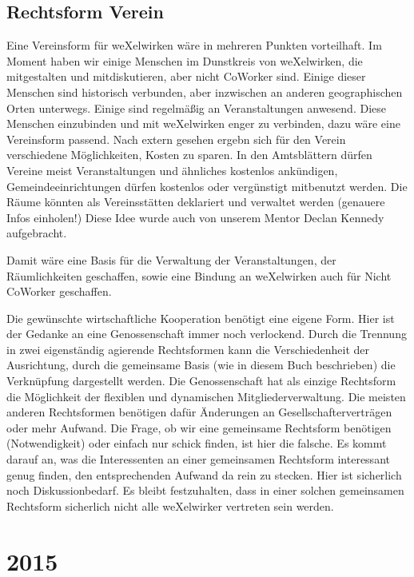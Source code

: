\subsection{Rechtsform Verein}
Eine Vereinsform für weXelwirken wäre in mehreren Punkten vorteilhaft.
%
Im Moment haben wir einige Menschen im Dunstkreis von weXelwirken, die mitgestalten und mitdiskutieren, aber nicht CoWorker sind.
%
Einige dieser Menschen sind historisch verbunden, aber inzwischen an anderen geographischen Orten unterwegs.
%
Einige sind regelmäßig an Veranstaltungen anwesend.
%
Diese Menschen einzubinden und mit weXelwirken enger zu verbinden, dazu wäre eine Vereinsform passend.
%
Nach extern gesehen ergebn sich für den Verein verschiedene Möglichkeiten, Kosten zu sparen.
%
In den Amtsblättern dürfen Vereine meist Veranstaltungen und ähnliches kostenlos ankündigen, Gemeindeeinrichtungen dürfen kostenlos oder vergünstigt mitbenutzt werden.
%
Die Räume könnten als Vereinsstätten deklariert und verwaltet werden (genauere Infos einholen!)
%
Diese Idee wurde auch von unserem Mentor Declan Kennedy aufgebracht.



Damit wäre eine Basis für die Verwaltung der Veranstaltungen, der Räumlichkeiten geschaffen, sowie eine Bindung an weXelwirken auch für Nicht CoWorker geschaffen.



Die gewünschte wirtschaftliche Kooperation benötigt eine eigene Form.
%
Hier ist der Gedanke an eine Genossenschaft immer noch verlockend.
%
Durch die Trennung in zwei eigenständig agierende Rechtsformen kann die Verschiedenheit der Ausrichtung, durch die gemeinsame Basis (wie in diesem Buch beschrieben) die Verknüpfung dargestellt werden.
%
Die Genossenschaft hat als einzige Rechtsform die Möglichkeit der flexiblen und dynamischen Mitgliederverwaltung.
%
Die meisten anderen Rechtsformen benötigen dafür Änderungen an Gesellschafterverträgen oder mehr Aufwand.
%
Die Frage, ob wir eine gemeinsame Rechtsform benötigen (Notwendigkeit) oder einfach nur schick finden, ist hier die falsche.
%
Es kommt darauf an, was die Interessenten an einer gemeinsamen Rechtsform interessant genug finden, den entsprechenden Aufwand da rein zu stecken.
%
Hier ist sicherlich noch Diskussionbedarf.
%
Es bleibt festzuhalten, dass in einer solchen gemeinsamen Rechtsform sicherlich nicht alle weXelwirker vertreten sein werden.
  \section{2015}
